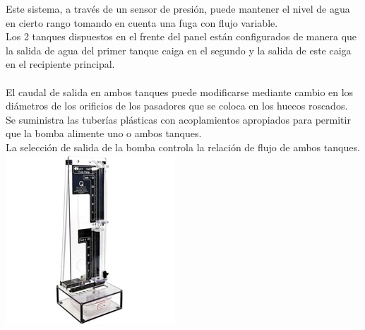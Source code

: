 \documentclass[12pt,a4paper]{book}
\begin{document}
Este sistema, a través de un sensor de presión, puede mantener el nivel de agua en cierto rango tomando en cuenta una fuga con flujo variable.
\\
Los 2 tanques dispuestos en el frente del panel están configurados de manera que la salida de agua del primer tanque caiga en el segundo y la salida de este caiga en el recipiente principal.
\\
\\ 
El caudal de salida en ambos tanques puede modificarse mediante cambio en los diámetros de los orificios de los pasadores que se coloca en los huecos roscados.
\\
Se suministra las tuberías plásticas con acoplamientos apropiados para permitir que la bomba alimente uno o ambos tanques.
\\
La selección de salida de la bomba controla la relación de flujo de ambos tanques.
\\
\includegraphics[scale=1]{./2_tanques_acoplados.jpg}


\newpage
\end{document}
